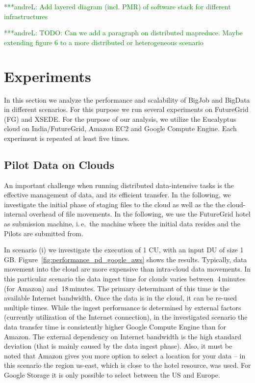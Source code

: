 \documentclass[times]{cpeauth}
\newcommand{\alnote}[1]{ {\textcolor{green} { ***andreL: #1 }}}
\newcommand{\alnote}[1]{}
\newcommand{\pilots}{Pilots\xspace}
\newcommand{\du}{DU\xspace}
\newcommand{\cu}{CU\xspace}
\begin{document}
\alnote{Add layered diagram (incl. PMR) of software stack for different 
infrastructures}

\alnote{TODO: Can we add a paragraph on distributed mapreduce. Maybe extending figure 6 to a more distributed or heterogeneous scenario}


\section{Experiments}

In this section we analyze the performance and scalability of BigJob and 
BigData in different scenarios. For this purpose we run several experiments on 
FutureGrid (FG) and XSEDE. For the purpose of our analysis, we utilize the 
Eucalyptus cloud on India/FutureGrid, Amazon EC2 and Google Compute Engine. 
Each experiment is repeated at least five times.

	
\subsection{Pilot Data on Clouds}

An important challenge when running distributed data-intensive tasks is the 
effective management of data, and its efficient transfer. In the following, we 
investigate the initial phase of staging files to the cloud as well as the 
the cloud-internal overhead of file movements.  In the following, we use the 
FutureGrid hotel as submission machine, i.\,e.\ the machine where the initial 
data resides and the \pilots are submitted from.

In scenario (i) we investigate the execution of 1 \cu, with an input \du of
size 1\,GB. Figure~\ref{fig:performance_pd_google_aws} shows the results.
Typically, data movement into the cloud are more expensive than intra-cloud
data movements. In this particular scenario the data ingest time for clouds
varies between $~$4\,minutes (for Amazon) and $~$18\,minutes. The primary
determinant of this time is the available Internet bandwidth. Once the data is
in the cloud, it can be re-used multiple times. While the ingest performance
is determined by external factors (currently utilization of the Internet
connection), in the investigated scenario the data transfer time is
consistently higher Google Compute Engine than for Amazon. The external
dependency on Internet bandwidth is the high standard deviation (that is
mainly caused by the data ingest phase). Also, it must be noted that Amazon
gives you more option to select a location for your data -- in this scenario
the region us-east, which is close to the hotel resource, was used. For Google 
Storage it is only possible to select between the US and Europe.
\end{document}
